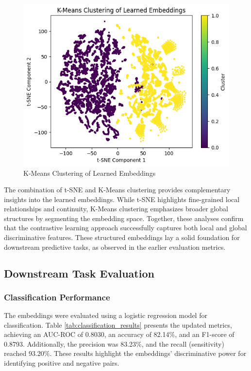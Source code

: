 \documentclass[twocolumn]{article}
\begin{document}
    \begin{figure}[ht]
        \centering
        \includegraphics[width=1\linewidth]{tsne_learned.png}
        \caption{K-Means Clustering of Learned Embeddings}
        \label{fig:kmeans_clustering}
    \end{figure}

    The combination of t-SNE and K-Means clustering provides complementary insights
    into the learned embeddings. While t-SNE highlights fine-grained local
    relationships and continuity, K-Means clustering emphasizes broader global structures
    by segmenting the embedding space. Together, these analyses confirm that the
    contrastive learning approach successfully captures both local and global discriminative
    features. These structured embeddings lay a solid foundation for downstream
    predictive tasks, as observed in the earlier evaluation metrics.

    \subsection{Downstream Task Evaluation}

    \subsubsection{Classification Performance}

    The embeddings were evaluated using a logistic regression model for classification.
    Table \ref{tab:classification_results} presents the updated metrics, achieving
    an AUC-ROC of 0.8030, an accuracy of 82.14\%, and an F1-score of 0.8793. Additionally,
    the precision was 83.23\%, and the recall (sensitivity) reached 93.20\%.
    These results highlight the embeddings' discriminative power for identifying
    positive and negative pairs.
\end{document}
